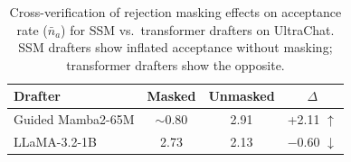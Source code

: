 \begin{table}[t]
\centering
\caption{Cross-verification of rejection masking effects on acceptance rate ($\bar{n}_a$) for SSM vs.\ transformer drafters on UltraChat. SSM drafters show inflated acceptance without masking; transformer drafters show the opposite.}
\label{tab:mask_cross}
\vspace{0.5em}
\begin{tabular}{@{}lccc@{}}
\toprule
\textbf{Drafter} & \textbf{Masked} & \textbf{Unmasked} & \textbf{$\Delta$} \\
\midrule
Guided Mamba2-65M & $\sim$0.80 & 2.91 & +2.11 $\uparrow$ \\
LLaMA-3.2-1B     & 2.73     & 2.13 & $-$0.60 $\downarrow$ \\
\bottomrule
\end{tabular}
\end{table}
